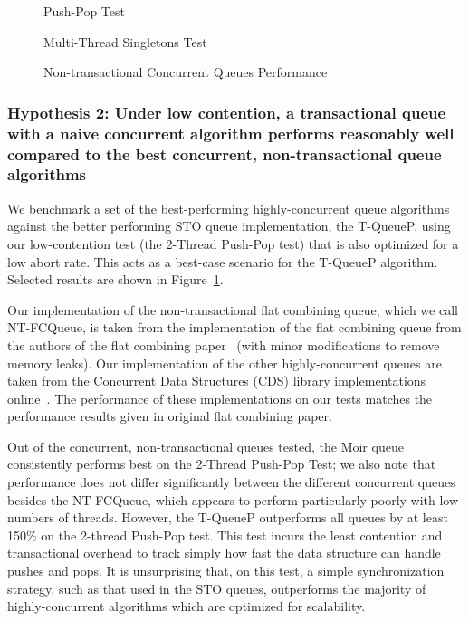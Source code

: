 \begin{figure}[H]
    \centering
	\begin{minipage}{0.75\textwidth}
        \caption*{Push-Pop Test}
        \vspace{12pt}
	\end{minipage}
   	\begin{minipage}{0.75\textwidth}
        \caption*{Multi-Thread Singletons Test}
	\end{minipage}
        \caption{Non-transactional Concurrent Queues Performance}
    \label{fig:ntqs}
\end{figure}

\subsubsection{Hypothesis 2: Under low contention, a transactional queue with a naive concurrent algorithm performs reasonably well compared to the best concurrent, non-transactional queue algorithms}

We benchmark a set of the best-performing highly-concurrent queue algorithms against the better performing STO queue implementation, the T-QueueP, using our low-contention test (the 2-Thread Push-Pop test) that is also optimized for a low abort rate. This acts as a best-case scenario for the T-QueueP algorithm. Selected results are shown in Figure~\ref{fig:ntqs}.

Our implementation of the non-transactional flat combining queue, which we call NT-FCQueue, is taken from the implementation of the flat combining queue from the authors of the flat combining paper~\cite{flatcombining} (with minor modifications to remove memory leaks). Our implementation of the other highly-concurrent queues are taken from the Concurrent Data Structures (CDS) library implementations online~\cite{libcds}. The performance of these implementations on our tests matches the performance results given in original flat combining paper. 

Out of the concurrent, non-transactional queues tested, the Moir queue~\cite{queue2} consistently performs best on the 2-Thread Push-Pop Test; we also note that performance does not differ significantly between the different concurrent queues besides the NT-FCQueue, which appears to perform particularly poorly with low numbers of threads. However, the T-QueueP outperforms all queues by at least 150\% on the 2-thread Push-Pop test. This test incurs the least contention and transactional overhead to track simply how fast the data structure can handle pushes and pops. It is unsurprising that, on this test, a simple synchronization strategy, such as that used in the STO queues, outperforms the majority of highly-concurrent algorithms which are optimized for scalability. 

